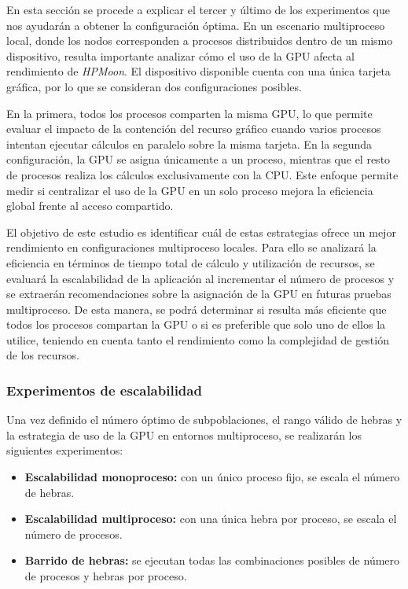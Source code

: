En esta sección se procede a explicar el tercer y último de los experimentos que nos ayudarán a obtener la configuración óptima. En un escenario multiproceso local, donde los nodos corresponden a procesos distribuidos dentro de un mismo dispositivo, resulta importante analizar cómo el uso de la GPU afecta al rendimiento de \textit{HPMoon}. El dispositivo disponible cuenta con una única tarjeta gráfica, por lo que se consideran dos configuraciones posibles.

En la primera, todos los procesos comparten la misma GPU, lo que permite evaluar el impacto de la contención del recurso gráfico cuando varios procesos intentan ejecutar cálculos en paralelo sobre la misma tarjeta. En la segunda configuración, la GPU se asigna únicamente a un proceso, mientras que el resto de procesos realiza los cálculos exclusivamente con la CPU. Este enfoque permite medir si centralizar el uso de la GPU en un solo proceso mejora la eficiencia global frente al acceso compartido.

El objetivo de este estudio es identificar cuál de estas estrategias ofrece un mejor rendimiento en configuraciones multiproceso locales. Para ello se analizará la eficiencia en términos de tiempo total de cálculo y utilización de recursos, se evaluará la escalabilidad de la aplicación al incrementar el número de procesos y se extraerán recomendaciones sobre la asignación de la GPU en futuras pruebas multiproceso. De esta manera, se podrá determinar si resulta más eficiente que todos los procesos compartan la GPU o si es preferible que solo uno de ellos la utilice, teniendo en cuenta tanto el rendimiento como la complejidad de gestión de los recursos.

\subsubsection{Experimentos de escalabilidad}

Una vez definido el número óptimo de subpoblaciones, el rango válido de hebras y la estrategia de uso de la GPU en entornos multiproceso, se realizarán los siguientes experimentos:

\begin{itemize}
    \item \textbf{Escalabilidad monoproceso:} con un único proceso fijo, se escala el número de hebras.
    \item \textbf{Escalabilidad multiproceso:} con una única hebra por proceso, se escala el número de procesos.
    \item \textbf{Barrido de hebras:} se ejecutan todas las combinaciones posibles de número de procesos y hebras por proceso.
\end{itemize}

